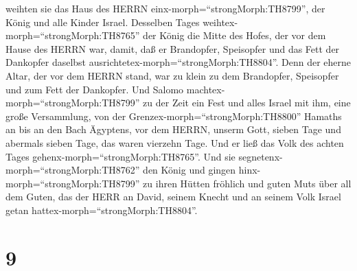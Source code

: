 weihten sie das Haus des HERRN einx-morph=``strongMorph:TH8799'', der
König und alle Kinder Israel.  Desselben Tages
weihtex-morph=``strongMorph:TH8765'' der König die Mitte des Hofes, der
vor dem Hause des HERRN war, damit, daß er Brandopfer, Speisopfer und
das Fett der Dankopfer daselbst
ausrichtetex-morph=``strongMorph:TH8804''. Denn der eherne Altar, der
vor dem HERRN stand, war zu klein zu dem Brandopfer, Speisopfer und zum
Fett der Dankopfer.  Und Salomo
machtex-morph=``strongMorph:TH8799'' zu der Zeit ein Fest und alles
Israel mit ihm, eine große Versammlung, von der
Grenzex-morph=``strongMorph:TH8800'' Hamaths an bis an den Bach
Ägyptens, vor dem HERRN, unserm Gott, sieben Tage und abermals sieben
Tage, das waren vierzehn Tage.  Und er ließ das Volk des
achten Tages gehenx-morph=``strongMorph:TH8765''. Und sie
segnetenx-morph=``strongMorph:TH8762'' den König und gingen
hinx-morph=``strongMorph:TH8799'' zu ihren Hütten fröhlich und guten
Muts über all dem Guten, das der HERR an David, seinem Knecht und an
seinem Volk Israel getan hattex-morph=``strongMorph:TH8804''.

\hypertarget{section-8}{%
\section{9}\label{section-8}}

